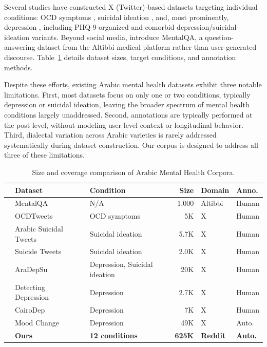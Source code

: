 \documentclass[11pt]{article}
\begin{document}
Several studies have constructed X (Twitter)-based datasets targeting individual conditions: OCD symptoms \citep{al2024classification}, suicidal ideation \citep{abdulsalam2024detecting, baghdadi2022optimized}, and, most prominently, depression \citep{hassib2022aradepsu, almouzini2019detecting, elramly2021cairodep, maghraby2022mood}, including PHQ-9-organized \citep{maghraby2022mood} and comorbid depression/suicidal-ideation \citep{hassib2022aradepsu} variants. Beyond social media, \citet{alhuzali2024mentalqa} introduce MentalQA, a question-answering dataset from the Altibbi medical platform rather than user-generated discourse. Table~\ref{tab:arabic_datasets} details dataset sizes, target conditions, and annotation methods.

Despite these efforts, existing Arabic mental health datasets exhibit three
notable limitations. First, most datasets focus on only one or two conditions,
typically depression or suicidal ideation, leaving the broader spectrum of mental
health conditions largely unaddressed. Second, annotations are typically performed
at the post level, without modeling user-level context or longitudinal behavior.
Third, dialectal variation across Arabic varieties is rarely addressed
systematically during dataset construction. Our corpus is designed to address
all three of these limitations.

\begin{table}
\centering
\small
\begin{tabular}{cl l rll}
\toprule
& \textbf{Dataset} & \textbf{Condition} & \textbf{Size} & \textbf{Domain} & \textbf{Anno.} \\
\midrule
& MentalQA~\cite{alhuzali2024mentalqa} & N/A & 1,000 & Altibbi & Human \\
& OCDTweets~\cite{al2024classification} & OCD symptoms & 5K & X & Human \\
& Arabic Suicidal Tweets~\cite{abdulsalam2024detecting} & Suicidal ideation & 5.7K & X & Human \\
& Suicide Tweets~\cite{baghdadi2022optimized} & Suicidal ideation & 2.0K & X & Human \\
& AraDepSu~\cite{hassib2022aradepsu} & Depression, Suicidal ideation & 20K & X & Human \\
& Detecting Depression~\cite{almouzini2019detecting} & Depression & 2.7K & X & Human \\
& CairoDep~\cite{elramly2021cairodep} & Depression & 7K & X & Human \\
& Mood Change~\cite{maghraby2022mood} & Depression & 49K & X & Auto. \\
\midrule
& \textbf{Ours} & \textbf{12 conditions} & \textbf{625K} & \textbf{Reddit} & \textbf{Auto.} \\

\bottomrule
\end{tabular}
\caption{Size and coverage comparison of Arabic Mental Health Corpora.}

\label{tab:arabic_datasets}
\end{table}
\end{document}
